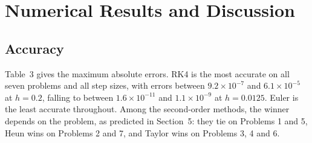 \documentclass[10pt,letterpaper]{article}
\begin{document}
\section{Numerical Results and Discussion}
\subsection{Accuracy}
Table~3 gives the maximum absolute errors. RK4 is the most accurate on all seven problems and all step sizes, with errors between $9.2\times10^{-7}$ and $6.1\times10^{-5}$ at $h=0.2$, falling to between $1.6\times10^{-11}$ and $1.1\times10^{-9}$ at $h=0.0125$. Euler is the least accurate throughout. Among the second-order methods, the winner depends on the problem, as predicted in Section~5: they tie on Problems 1 and 5, Heun wins on Problems 2 and 7, and Taylor wins on Problems 3, 4 and 6.
\end{document}
